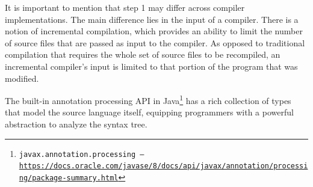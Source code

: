 It is important to mention that step 1 may differ across compiler implementations. The main difference lies in the input of a compiler. There is a notion of incremental compilation, which provides an ability to limit the number of source files that are passed as input to the compiler. As opposed to traditional compilation that requires the whole set of source files to be recompiled, an incremental compiler’s input is limited to that portion of the program that was modified.

\n

The built-in annotation processing API in Java\footnote{\texttt{javax.annotation.processing -- \url{https://docs.oracle.com/javase/8/docs/api/javax/annotation/processing/package-summary.html}}} has a rich collection of types that model the source language itself, equipping programmers with a powerful abstraction to analyze the syntax tree.
